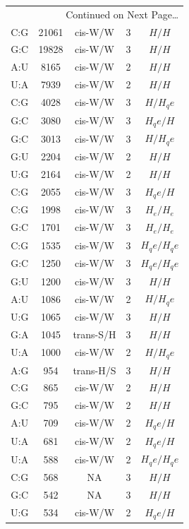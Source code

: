 \begin{center}
\begin{longtable}{c|c|c|c|c}
\multicolumn{5}{r}{Continued on Next Page\ldots} \\
\endfoot
\endlastfoot
C:G & 21061 & cis-W/W & 3 & $H/H$ \\  \hline
G:C & 19828 & cis-W/W & 3 & $H/H$ \\  \hline
A:U & 8165 & cis-W/W & 2 & $H/H$ \\  \hline
U:A & 7939 & cis-W/W & 2 & $H/H$ \\  \hline
C:G & 4028 & cis-W/W & 3 & $H/H_qe$ \\  \hline
G:C & 3080 & cis-W/W & 3 & $H_qe/H$ \\  \hline
G:C & 3013 & cis-W/W & 3 & $H/H_qe$ \\  \hline
G:U & 2204 & cis-W/W & 2 & $H/H$ \\  \hline
U:G & 2164 & cis-W/W & 2 & $H/H$ \\  \hline
C:G & 2055 & cis-W/W & 3 & $H_qe/H$ \\  \hline
C:G & 1998 & cis-W/W & 3 & $H_e/H_e$ \\  \hline
G:C & 1701 & cis-W/W & 3 & $H_e/H_e$ \\  \hline
C:G & 1535 & cis-W/W & 3 & $H_qe/H_qe$ \\  \hline
G:C & 1250 & cis-W/W & 3 & $H_qe/H_qe$ \\  \hline
G:U & 1200 & cis-W/W & 3 & $H/H$ \\  \hline
A:U & 1086 & cis-W/W & 2 & $H/H_qe$ \\  \hline
U:G & 1065 & cis-W/W & 3 & $H/H$ \\  \hline
G:A & 1045 & trans-S/H & 3 & $H/H$ \\  \hline
U:A & 1000 & cis-W/W & 2 & $H/H_qe$ \\  \hline
A:G & 954 & trans-H/S & 3 & $H/H$ \\  \hline
C:G & 865 & cis-W/W & 2 & $H/H$ \\  \hline
G:C & 795 & cis-W/W & 2 & $H/H$ \\  \hline
A:U & 709 & cis-W/W & 2 & $H_qe/H$ \\  \hline
U:A & 681 & cis-W/W & 2 & $H_qe/H$ \\  \hline
U:A & 588 & cis-W/W & 2 & $H_qe/H_qe$ \\  \hline
C:G & 568 & NA & 3 & $H/H$ \\  \hline
G:C & 542 & NA & 3 & $H/H$ \\  \hline
U:G & 534 & cis-W/W & 2 & $H_qe/H$ \\  \hline

\end{longtable}
\end{center}
